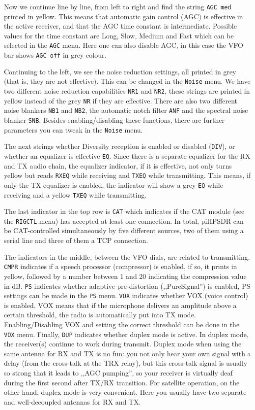 \documentclass[12pt]{book}
\def\rett#1{\texttt{\color{red}#1}}
\def\bltt#1{\texttt{\color{blue}#1}}
\begin{document}
Now we continue line by line, from left to right and find
the string \rett{AGC med} printed in yellow. This means
that automatic gain control (AGC)  is effective  in the
active receiver, and that the AGC time constant is
intermediate. Possible values for the time constant 
are Long, Slow, Medium and Fast which can be selected
in the \bltt{AGC} menu. Here one can  also disable AGC,
in this case the VFO bar shows \rett{AGC off} in grey
colour.

Continuing to the left, we see the noise reduction settings,
all printed in grey (that is, they are not effective). This
can be changed in the \bltt{Noise} menu. We have two different
noise reduction capabilities \rett{NR1} and \rett{NR2}, these
strings are printed in yellow instead of the grey \rett{NR} if
they are effective. There are also two different noise blankers
\rett{NB1} and \rett{NB2}, the automatic notch  filter
\rett{ANF} and the spectral  noise blanker \rett{SNB}.
Besides enabling/disabling these functions, there are  further parameters
you can tweak in the \bltt{Noise} menu.

The next strings whether Diversity reception is enabled or disabled
(\rett{DIV}), or whether an equalizer is effective \rett{EQ}.
Since there is a separate equalizer for the RX and TX audio chain,
the equalizer indicator, if it is effective, not only turns yellow
but reads \rett{RXEQ} while receiving and \rett{TXEQ} while
transmitting. This means, if only the TX equalizer is enabled,
the indicator will show a  grey \rett{EQ} while receiving
and a yellow \rett{TXEQ}  while  transmitting.

The last indicator in the top row  is \rett{CAT} which indicates
if the CAT module  (see the \bltt{RIGCTL}  menu) has accepted at least
one connection. In total, piHPSDR can be CAT-controlled simultaneously
by five different sources, two of them using a serial line and
three of them a TCP connection. 

The indicators in the middle, between the VFO dials, are related to
transmitting. \rett{CMPR} indicates if a speech processor
(compressor) is enabled, if so, it prints in yellow, followed
by a number between 1 and 20 indicating the compression value in dB.
\rett{PS} indicates whether adaptive pre-distortion (,,PureSignal'')
is enabled, PS settings can be made in the \bltt{PS} menu.
 \rett{VOX} indicates whether VOX (voice control) is enabled. VOX means
 that if  the microphone delivers an amplitude above a certain threshold,
 the radio is automatically put into TX mode. Enabling/Disabling VOX
 and setting the correct threshold can be done in the \bltt{VOX} menu.
 Finally, \rett{DUP} indicates whether duplex mode is active.
 In duplex mode, the receiver(s) continue to work during transmit. Duplex
 mode when using the same antenna for RX and TX is  no fun: you not only hear
 your own signal with a delay (from the cross-talk at the TRX relay), but
 this cross-talk signal is  usually so strong that it leads to ,,AGC pumping'', so
 your receiver is virtually deaf during the first second after TX/RX
 transition. For satellite operation, on the other hand, duplex  mode
 is very convenient. Here you usually have two separate and well-decoupled
 antennas for RX and TX.
 
\end{document}

